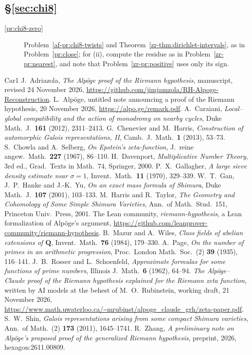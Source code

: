 \documentclass[reqno]{amsart}
\theoremstyle{definition}
\theoremstyle{plain}
\begin{document}
\subsection*{\S\ref{sec:chi8}}
\begin{description}
\item[\ref{pr:chi8-zero}] Problem~\ref{af-pr:chi8-twists} and Theorem~\ref{zr-thm:dirichlet-intervals}, as in Problem~\ref{pr:close}; for (ii), compute the residue as in Problem~\ref{zr-pr:nearest}, and note that Problem~\ref{zr-pr:positive} uses only its sign.
\end{description}

\begin{thebibliography}{Car1}
 J.~Adriazola, \emph{The Alp\"oge proof of the Riemann hypothesis}, manuscript, revised 24 November 2026, \url{https://github.com/jimjamzola/RH-Alpoge-Reconstruction}.
 L.~Alp\"oge, untitled note announcing a proof of the Riemann hypothesis, 20 November 2026, \url{https://alpo.ge/remark.pdf}.
 A.~Caraiani, \emph{Local--global compatibility and the action of monodromy on nearby cycles}, Duke Math.\ J.\ \textbf{161} (2012), 2311--2413.
 G.~Chenevier and M.~Harris, \emph{Construction of automorphic Galois representations, II}, Camb.\ J.\ Math.\ \textbf{1} (2013), 53--73.
 S.~Chowla and A.~Selberg, \emph{On Epstein's zeta-function}, J.\ reine angew.\ Math.\ \textbf{227} (1967), 86--110.
 H.~Davenport, \emph{Multiplicative Number Theory}, 3rd ed., Grad.\ Texts in Math.\ 74, Springer, 2000.
 P.~X.~Gallagher, \emph{A large sieve density estimate near \(\sigma = 1\)}, Invent.\ Math.\ \textbf{11} (1970), 329--339.
 W.~T.~Gan, J.~P.~Hanke and J.-K.~Yu, \emph{On an exact mass formula of Shimura}, Duke Math.\ J.\ \textbf{107} (2001), 103--133.
 M.~Harris and R.~Taylor, \emph{The Geometry and Cohomology of Some Simple Shimura Varieties}, Ann.\ of Math.\ Stud.\ 151, Princeton Univ.\ Press, 2001.
 The Lean community, \emph{riemann-hypothesis}, a Lean formalization of Alp\"oge's argument, \url{https://github.com/leanprover-community/riemann-hypothesis}.
 B.~Mazur and A.~Wiles, \emph{Class fields of abelian extensions of \(\mathbf{Q}\)}, Invent.\ Math.\ \textbf{76} (1984), 179--330.
 A.~Page, \emph{On the number of primes in an arithmetic progression}, Proc.\ London Math.\ Soc.\ (2) \textbf{39} (1935), 116--141.
 J.~B.~Rosser and L.~Schoenfeld, \emph{Approximate formulas for some functions of prime numbers}, Illinois J.\ Math.\ \textbf{6} (1962), 64--94.
 \emph{The Alp\"oge--Claude proof of the Riemann hypothesis explained for the Riemann zeta function}, written by AI models at the behest of M.~O.~Rubinstein, working draft, 21 November 2026, \url{https://www.math.uwaterloo.ca/~mrubinst/alpoge_claude_grh/zeta-paper.pdf}.
 S.~W.~Shin, \emph{Galois representations arising from some compact Shimura varieties}, Ann.\ of Math.\ (2) \textbf{173} (2011), 1645--1741.
 R.~Zhang, \emph{A preliminary note on Alp\"oge's proposed proof of the generalized Riemann hypothesis}, preprint, 2026, hexagon:2611.00809.
\end{thebibliography}
\end{document}
